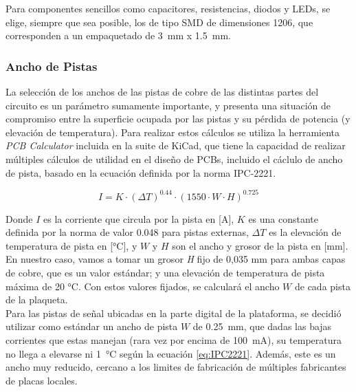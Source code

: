 Para componentes sencillos como capacitores, resistencias, diodos y LEDs, se elige, siempre que sea posible, los de tipo SMD de dimensiones 1206, que corresponden a un empaquetado de \SI[]{3}[]{\milli\metre} x \SI[]{1.5}[]{\milli\metre}.\\

\subsubsection{Ancho de Pistas}

La selección de los anchos de las pistas de cobre de las distintas partes del circuito es un parámetro sumamente importante, y presenta una situación de compromiso entre la superficie ocupada por las pistas y su pérdida de potencia (y elevación de temperatura). Para realizar estos cálculos se utiliza la herramienta \textit{PCB Calculator} incluida en la suite de KiCad, que tiene la capacidad de realizar múltiples cálculos de utilidad en el diseño de PCBs, incluido el cáclulo de ancho de pista, basado en la ecuación definida por la norma IPC-2221.

\begin{equation}\label{eq:IPC2221}
    I = K\cdot (\Delta T)^{\num{0.44}}\cdot (\num{1550}\cdot W\cdot H)^{\num{0.725}}
\end{equation}

Donde $I$ es la corriente que circula por la pista en [\unit{\ampere}], $K$ es una constante definida por la norma de valor \num{0.048} para pistas externas, $\Delta T$ es la elevación de temperatura de pista en [\unit{\celsius}], y $W$ y $H$ son el ancho y grosor de la pista en [\unit{\milli\metre}].\\

En nuestro caso, vamos a tomar un {\Medium grosor \textit{H} fijo de 0,035 mm} para ambas capas de cobre, que es un valor estándar; y una {\Medium elevación de temperatura de pista máxima de 20 °C}. Con estos valores fijados, se calculará el ancho $W$ de cada pista de la plaqueta.\\

Para las pistas de señal ubicadas en la parte digital de la plataforma, se decidió utilizar como estándar un ancho de pista $W$ de \SI[]{0.25}[]{\milli\metre}, que dadas las bajas corrientes que estas manejan (rara vez por encima de \SI[]{100}[]{\milli\ampere}), su temperatura no llega a elevarse ni \SI[]{1}[]{\celsius} según la ecuación \ref{eq:IPC2221}. Además, este es un ancho muy reducido, cercano a los limites de fabricación de múltiples fabricantes de placas locales.\\